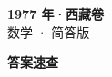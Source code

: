 \documentclass[zihao=-4, a4paper]{ctexart}
\begin{document}
\begin{center}
  {\Large\bfseries 1977 年·西藏卷}\\[4pt]
  {\large 数学 · 简答版}
\end{center}
\medskip
{}

\clearpage
{}
\begin{center}{\Large\bfseries 答案速查}\end{center}
\medskip

\end{document}
